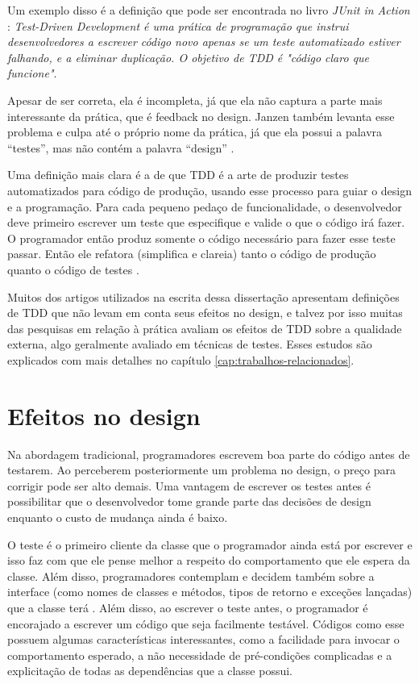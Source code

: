Um exemplo disso é a definição que pode ser encontrada no livro \textit{JUnit
in Action} \cite{junit-in-action}: \textit{Test-Driven Development é uma
prática de programação que instrui desenvolvedores a escrever código novo
apenas se um teste automatizado estiver falhando, e a eliminar duplicação. O
objetivo de TDD é "código claro que funcione"}.

Apesar de ser correta, ela é incompleta, já que ela não captura a parte mais
interessante da prática, que é feedback no design. Janzen também levanta esse
problema e culpa até o próprio nome da prática, já que ela possui a palavra
``testes'', mas não contém a palavra ``design'' \cite{tdd-really-improve}.

Uma definição mais clara é a de que TDD é a arte de produzir testes
automatizados para código de produção, usando esse processo para guiar o design e a programação.
Para cada pequeno pedaço de funcionalidade, o desenvolvedor deve primeiro
escrever um teste que especifique e valide o que o código irá fazer. O
programador então produz somente o código necessário para fazer esse teste
passar. Então ele refatora (simplifica e clareia) tanto o código de produção
quanto o código de testes \cite{agilealliance-tdd} \cite{tdd-taxonomy}.

Muitos dos artigos utilizados na escrita dessa dissertação apresentam definições
de TDD que não levam em conta seus efeitos no design, e talvez por isso muitas das 
pesquisas em relação à prática avaliam os efeitos de TDD sobre a qualidade 
externa, algo geralmente avaliado em técnicas de testes. Esses estudos são 
explicados com mais detalhes no capítulo \ref{cap:trabalhos-relacionados}.

\section{Efeitos no design}

Na abordagem tradicional, programadores escrevem boa parte do código antes de
testarem. Ao perceberem posteriormente um problema no design, o preço para
corrigir pode ser alto demais. Uma vantagem de escrever os testes antes é
possibilitar que o desenvolvedor tome grande parte das decisões de design
enquanto o custo de mudança ainda é baixo.

O teste é o primeiro cliente da
classe que o programador ainda está por escrever e isso faz com que ele pense
melhor a respeito do comportamento que ele espera da classe. Além disso,
programadores contemplam e decidem também sobre a interface (como nomes de
classes e métodos, tipos de retorno e exceções lançadas) que a classe terá
\cite{janzen-saiedian}.
Além disso, ao escrever o teste antes, o programador é encorajado a escrever um
código que seja facilmente testável. Códigos como esse possuem algumas
características interessantes, como a facilidade para invocar o comportamento
esperado, a não necessidade de pré-condições complicadas e a explicitação de
todas as dependências que a classe possui.

